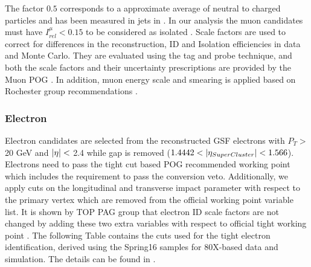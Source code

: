 The factor $0.5$ corresponds to a approximate average of neutral to charged particles and has
been measured in jets in \cite{CMS:2010eua}. In our analysis the muon candidates must have $I_{rel}^{\mu}<0.15$ to be
considered as isolated \cite{muonid}.
Scale factors are used to correct for differences in the reconstruction, ID and Isolation efficiencies in data and Monte Carlo. They are evaluated using the tag and probe technique, and both
the scale factors and their uncertainty prescriptions are provided by the Muon POG \cite{muonsf}.
In addition, muon energy scale and smearing is applied  based on Rochester group  recommendations \cite{Rochester}.


\subsubsection{Electron}

Electron candidates are selected from the reconstructed GSF electrons with  $ P_{T}>$ 20 GeV and $|{\eta}|<$ 2.4 while gap is removed ($1.4442 < |{\eta_{SuperCluster} }|< 1.566$).
Electrons need to pass the tight cut based POG recommended working point \cite{eleid} which includes the requirement to pass the conversion veto.
Additionally, we apply cuts on the longitudinal and transverse impact parameter with respect to the primary vertex which are removed from the official working point variable list.
It is shown by TOP PAG group that electron ID scale factors are not changed by adding these two extra variables with respect to official tight working point \cite{eleid}.
The following Table contains the cuts used for the tight electron identification, derived using the Spring16 samples for 80X-based data and simulation. The details can be found in \cite{eleid}.

